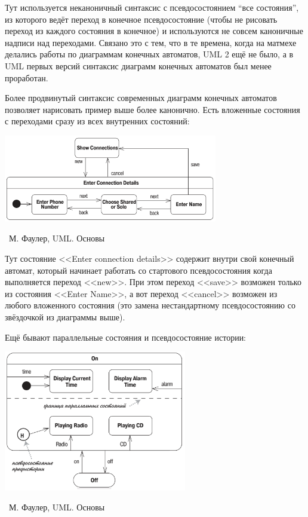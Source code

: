 \documentclass[a5paper]{article}
\newcommand{\attribution}[1] {
    \vspace{-5mm}\begin{flushright}\begin{scriptsize}%
    {\textcopyright\, #1}\end{scriptsize}\end{flushright}
}
\begin{document}
Тут используется неканоничный синтаксис с псевдосостоянием ``все состояния'', из которого ведёт переход в конечное псевдосостояние (чтобы не рисовать переход из каждого состояния в конечное) и используются не совсем каноничные надписи над переходами. Связано это с тем, что в те времена, когда на матмехе делались работы по диаграммам конечных автоматов, UML 2 ещё не было, а в UML первых версий синтаксис диаграмм конечных автоматов был менее проработан.

Более продвинутый синтаксис современных диаграмм конечных автоматов позволяет нарисовать пример выше более канонично. Есть вложенные состояния с переходами сразу из всех внутренних состояний:

\begin{center}
    \includegraphics[width=0.7\textwidth]{stateTransitionNestedStates.png}
    \attribution{М. Фаулер, UML. Основы}
\end{center}

Тут состояние <<Enter connection details>> содержит внутри свой конечный автомат, который начинает работать со стартового псевдосостояния когда выполняется переход <<new>>. При этом переход <<save>> возможен только из состояния <<Enter Name>>, а вот переход <<cancel>> возможен из любого вложенного состояния (это замена нестандартному псевдосостоянию со звёздочкой из диаграммы выше).

Ещё бывают параллельные состояния и псевдосостояние истории:

\begin{center}
    \includegraphics[width=0.6\textwidth]{stateTransitionParallelStates.png}
    \attribution{М. Фаулер, UML. Основы}
\end{center}
\end{document}
